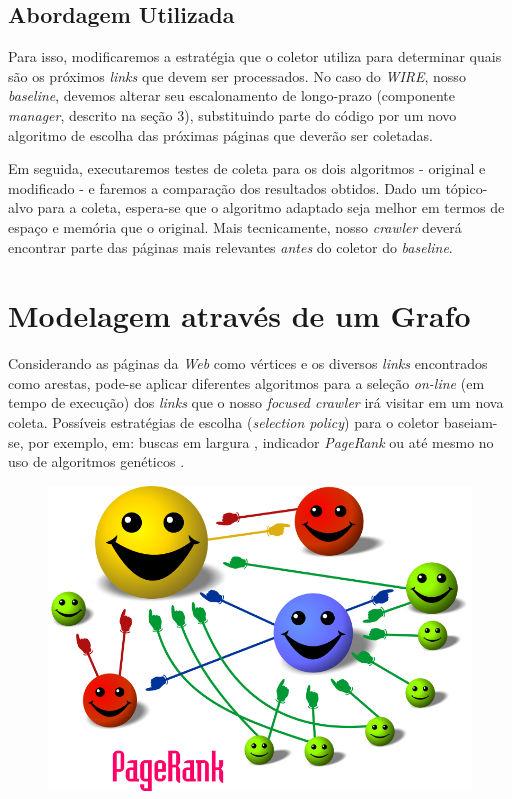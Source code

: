\documentclass[a4paper,12pt,titlepage]{article}
\begin{document}
\subsection{Abordagem Utilizada}

Para isso, modificaremos a estratégia que o coletor utiliza para determinar quais são os próximos \textit{links} que devem ser processados. No caso do \textit{WIRE}, nosso \textit{baseline}, devemos alterar seu escalonamento de longo-prazo (componente \textit{manager}, descrito na seção 3), substituindo parte do código por um novo algoritmo de escolha das próximas páginas que deverão ser coletadas.

Em seguida, executaremos testes de coleta para os dois algoritmos - original e modificado - e faremos a comparação dos resultados obtidos. Dado um tópico-alvo para a coleta, espera-se que o algoritmo adaptado seja melhor em termos de espaço e memória que o original. Mais tecnicamente, nosso \textit{crawler} deverá encontrar parte das páginas mais relevantes \textit{antes} do coletor do \textit{baseline}. 

\section{Modelagem através de um Grafo}

Considerando as páginas da \textit{Web} como vértices e os diversos \textit{links} encontrados como arestas, pode-se aplicar diferentes algoritmos para a seleção \textit{on-line} (em tempo de execução) dos \textit{links} que o nosso \textit{focused crawler} irá visitar em um nova coleta. Possíveis estratégias de escolha (\textit{selection policy}) para o coletor baseiam-se, por exemplo, em: buscas em largura \cite{najork}, indicador \textit{PageRank} \cite{cho} ou até mesmo no uso de algoritmos genéticos \cite{johnson}. 

\begin{figure}[H]
     \centering
     \includegraphics[scale=0.4]{figures/pagerank.png}
     \caption{}
     \label{bsp}
\end{figure}
\end{document}
